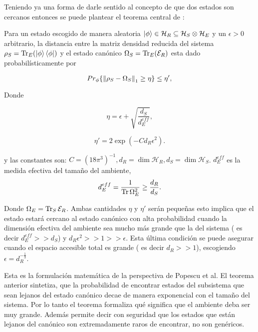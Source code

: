 Teniendo ya una forma de darle sentido al concepto de que dos estados son cercanos entonces se puede plantear el teorema central de \cite{Popescu2006}:
\\
\begin{theorem} \label{teorema principal}
Para un estado escogido de manera aleatoria $\ket{\phi} \in \mathcal{H}_{R} \subseteq \mathcal{H}_{S} \otimes \mathcal{H}_{E} $ y un $\epsilon > 0$ arbitrario, la distancia entre la matriz densidad reducida del sistema $\rho_{S}=\Tr_{E}(\ket{\phi} \bra{\phi})$  y el estado canónico $\Omega_{S}=\Tr_{E} ( \mathcal{E}_{R})$ esta dado probabilísticamente por 

\begin{equation}
Pr_{\phi} \{  \norm{\rho_{S} -\Omega_{S}}_{1} \geq \eta \} \leq \eta',
\end{equation}

Donde 

\begin{equation}
\eta= \epsilon + \sqrt{ \frac{d_{S}}{d_{E}^{eff}} },
\end{equation}

\begin{equation}
\eta'=2\exp (-C d_{R} \epsilon^{2} ).
\end{equation}

y las constantes son: $ C=(18 \pi^{3})^{-1}, d_{R} = \dim \mathcal{H}_{R}, d_{S} = \dim \mathcal{H}_{S} $. $d_{E}^{eff}$ es la medida efectiva del tamaño del ambiente,
\begin{equation}
d_{E}^{eff}= \frac{1}{\Tr \Omega_{E}^{2}} \ge \frac{d_{R}}{d_{S}}.
\end{equation}

Donde $\Omega_{E}= \Tr_{S} \mathcal{E}_{R}$. Ambas cantidades $\eta $ y $\eta'$ serán pequeñas esto implica que el estado estará cercano al estado canónico con alta probabilidad cuando la dimensión efectiva del ambiente sea mucho más grande que la del sistema ( es decir $d_{E}^{eff} >> d_{S}$) y  $d_{R}\epsilon^2>>1>>\epsilon$. Esta última condición se puede asegurar cuando el espacio accesible total es grande ( es decir $d_{R}>>1$), escogiendo $\epsilon=d_{R}^{-\frac{1}{3}}$.\\
\end{theorem}
Esta es la formulación matemática de la perspectiva de Popescu et al. El teorema anterior sintetiza, que la probabilidad de encontrar estados del subsistema que sean lejanos del estado canónico decae de manera exponencial con el tamaño del sistema. Por lo tanto el teorema formaliza qué significa que el ambiente deba ser muy grande. Además permite decir con seguridad que los estados que están lejanos del canónico son extremadamente raros de encontrar, no son genéricos.
\\

